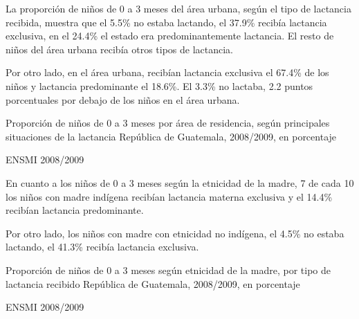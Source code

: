 
%
{%
La proporción de niños de 0 a 3 meses del área urbana, según el tipo de lactancia recibida, muestra que el 5.5\% no estaba lactando, el 37.9\% recibía lactancia exclusiva, en el 24.4\% el estado era predominantemente lactancia. El resto de niños del área urbana recibía otros tipos de lactancia\llamada. 

Por otro lado, en el área urbana, recibían lactancia exclusiva el 67.4\% de los niños y lactancia predominante el 18.6\%. El 3.3\% no lactaba, 2.2 puntos porcentuales por debajo de los niños en el área urbana.}%
{%
	Proporción de niños de 0 a 3 meses por área de residencia, según principales situaciones de la lactancia
	} %
{%
	República de Guatemala, 2008/2009, en porcentaje} %
{%
	\begin{tikzpicture}[x=1pt,y=1pt]    \end{tikzpicture}
}%
{%
	ENSMI 2008/2009} %



%
{%
En cuanto a los niños de 0 a 3 meses según la etnicidad de la madre, 7 de cada 10 los niños con madre indígena recibían lactancia materna exclusiva y el 14.4\% recibían lactancia predominante. 


Por otro lado, los niños con madre con etnicidad no indígena, el 4.5\% no estaba lactando, el 41.3\%  recibía lactancia exclusiva.}%
{%
 Proporción de niños de 0 a 3 meses según etnicidad de la madre, por tipo de lactancia recibido
} %
{%
	República de Guatemala, 2008/2009, en porcentaje} %
{%
	\begin{tikzpicture}[x=1pt,y=1pt]    \end{tikzpicture}
}%
{%
	ENSMI 2008/2009} %



